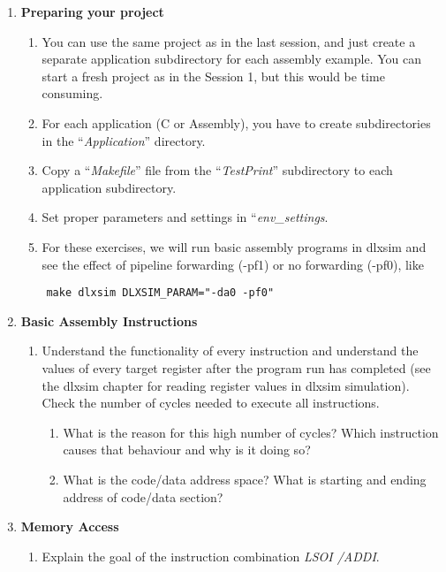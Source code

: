 \begin{enumerate}[start=0]
\item \textbf{Preparing your project}
	\begin{enumerate}
		\item
		You can use the same project as in the last session, and just create
		a separate application subdirectory for each assembly example. You
		can start a fresh project as in the Session 1, but this would be
		time consuming.
		\item
		For each application (C or Assembly), you have to create
		subdirectories in the ``\emph{Application}'' directory.
		\item
		Copy a ``\emph{Makefile}'' file from the ``\emph{TestPrint}''
		subdirectory to each application subdirectory.
		\item
		Set proper parameters and settings in ``\emph{env\_settings}.
		\item
		For these exercises, we will run basic assembly programs in dlxsim
		and see the effect of pipeline forwarding (-pf1) or no forwarding
		(-pf0), like
	\end{enumerate}
\begin{lstlisting}
	make dlxsim DLXSIM_PARAM="-da0 -pf0"
\end{lstlisting}
\item \textbf{Basic Assembly Instructions}
	\begin{enumerate}
	\item Understand the functionality of every instruction and understand the
	values of every target register after the program run has completed (see
	the dlxsim chapter for reading register values in dlxsim simulation).
	Check the number of cycles needed to execute all instructions.
	\begin{enumerate}[label=(\alph*)]
	\color{red}\item\normalcolor What is the reason for this high number of cycles? Which instruction
	causes that behaviour and why is it doing so?
	\color{red}\item\normalcolor What is the code/data address space? What is starting and ending
	address of code/data section?
	\end{enumerate}
	\end{enumerate}
\item \textbf{Memory Access}
	\begin{enumerate}[label=(\alph*)]
	\color{red}\item\normalcolor
	Explain the goal of the instruction combination \emph{LSOI /ADDI}.

\end{enumerate}
\end{enumerate}
